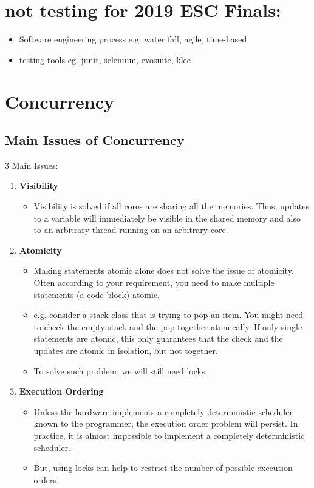 \documentclass[a4paper]{article}
\begin{document}
\section*{not testing for 2019 ESC Finals:}
\begin{itemize}
	\item Software engineering process e.g. water fall, agile, time-based
	\item testing tools eg. junit, selenium, evosuite, klee
\end{itemize}

\tableofcontents

\newpage
\section{Concurrency}
\subsection{Main Issues of Concurrency}
3 Main Issues:
\begin{enumerate}
	\item \textbf{Visibility}
	\begin{itemize}
		\item Visibility is solved if all cores are sharing all the memories. Thus, updates to a variable will immediately be visible in the shared memory and also to an arbitrary thread running on an arbitrary core.
	\end{itemize}
	\item \textbf{Atomicity}
	\begin{itemize}
		\item Making statements atomic alone does not solve the issue of atomicity. Often according to your requirement, you need to make multiple statements (a code block) atomic.
		\item e.g. consider a stack class that is trying to pop an item. You might need to check the empty stack and the pop together atomically. If only single statements are atomic, this only guarantees that the check and the updates are atomic in isolation, but not together.
		\item To solve such problem, we will still need locks.
	\end{itemize}
	\item \textbf{Execution Ordering}
	\begin{itemize}
		\item Unless the hardware implements a completely deterministic scheduler known to the programmer, the execution order problem will persist. In practice, it is almost impossible to implement a completely deterministic scheduler.
		\item But, using locks can help to restrict the number of possible execution orders.
	\end{itemize}
\end{enumerate}
\end{document}
